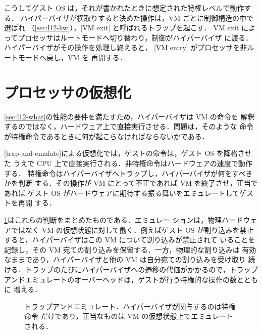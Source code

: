 \documentclass[../main.tex]{subfiles}
\begin{document}
こうしてゲスト OS は，それが書かれたときに想定された特権レベルで動作する．
ハイパーバイザが横取りすると決めた操作は，VM ごとに制御構造の中で選ばれ
（\cref{sec:l12-hw}），[VM exit] と呼ばれるトラップを起こす．
VM exit によってプロセッサはルートモードへ切り替わり，制御がハイパーバイザ
に渡る．ハイパーバイザがその操作を処理し終えると，
[VM entry] がプロセッサを非ルートモードへ戻し，VM を
再開する．

\section{プロセッサの仮想化}
\label{sec:l12-cpu}

\cref{sec:l12-what}の性能の要件を満たすため，ハイパーバイザは VM の命令を
解釈するのではなく，ハードウェア上で直接実行させる．問題は，そのような
命令が特権命令であるときに何が起こらなければならないかである．

\begin{definition}[トラップアンドエミュレート]
  [trap-and-emulate]による仮想化では，ゲストの命令は，ゲスト OS を降格させた
  うえで CPU 上で直接実行される．非特権命令はハードウェアの速度で動作する．
  特権命令はハイパーバイザへトラップし，ハイパーバイザが何をすべきかを判断
  する．その操作が VM にとって不正であれば VM を終了させ，正当であれば
  ゲスト OS がハードウェアに期待する振る舞いをエミュレートしてゲストを再開
  する．
\end{definition}

\cref{fig:l12-trap-emulate}はこれらの判断をまとめたものである．エミュレー
ションは，物理ハードウェアではなく VM の仮想状態に対して働く．例えばゲスト OS
が割り込みを禁止すると，ハイパーバイザはこの VM について割り込みが禁止されて
いることを記録し，その VM 宛ての割り込みを保留する．一方，物理的な割り込みは
有効なままであり，ハイパーバイザと他の VM は自分宛ての割り込みを受け取り
続ける．トラップのたびにハイパーバイザへの遷移の代価がかかるので，トラップ
アンドエミュレートのオーバーヘッドは，ゲストが行う特権的な操作の数とともに
増える．

\begin{figure}[htbp]
  \centering
  
  \caption{トラップアンドエミュレート．ハイパーバイザが関与するのは特権命令
    だけであり，正当なものは VM の仮想状態上でエミュレートされる．}
  \label{fig:l12-trap-emulate}
\end{figure}
\end{document}
